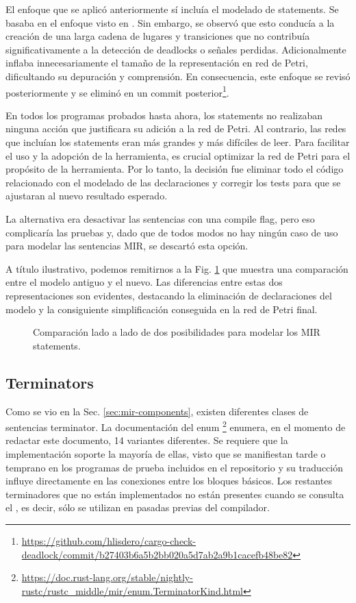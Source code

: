 El enfoque que se aplicó anteriormente sí incluía el modelado de statements. Se basaba en el
enfoque visto en \cite{meyer2020}. Sin embargo, se observó que esto conducía a la creación de
una larga cadena de lugares y transiciones que no contribuía significativamente a la detección
de deadlocks o señales perdidas. Adicionalmente inflaba innecesariamente el tamaño de la
representación en red de Petri, dificultando su depuración y comprensión. En consecuencia,
este enfoque se revisó posteriormente y se eliminó en un
commit posterior\footnote{\url{https://github.com/hlisdero/cargo-check-deadlock/commit/b27403b6a5b2bb020a5d7ab2a9b1cacefb48be82}}.

En todos los programas probados hasta ahora, los statements no realizaban
ninguna acción que justificara su adición a la red de Petri. Al contrario, las redes que
incluían los statements eran más grandes y más difíciles de leer. Para facilitar el uso y la
adopción de la herramienta, es crucial optimizar la red de Petri para el propósito de la
herramienta. Por lo tanto, la decisión fue eliminar todo el código relacionado con el modelado
de las declaraciones y corregir los tests para que se ajustaran al nuevo resultado esperado.

La alternativa era desactivar las sentencias con una compile flag, pero eso
complicaría las pruebas y, dado que de todos modos no hay ningún caso de uso para modelar
las sentencias \acrshort{MIR}, se descartó esta opción.

A título ilustrativo, podemos remitirnos a la Fig. \ref{fig:statement-model-comparison}
que muestra una comparación entre el modelo antiguo y el nuevo.
Las diferencias entre estas dos representaciones son
evidentes, destacando la eliminación de declaraciones del modelo y la consiguiente
simplificación conseguida en la red de Petri final.

\begin{figure}[!htb]
  \centering
  
  \caption{Comparación lado a lado de dos posibilidades para modelar los MIR statements.}
  \label{fig:statement-model-comparison}
\end{figure}

\subsection{Terminators}
\label{sec:terminators}

Como se vio en la Sec. \ref{sec:mir-components}, existen diferentes clases de sentencias terminator.
La documentación del enum \footnote{\url{https://doc.rust-lang.org/stable/nightly-rustc/rustc_middle/mir/enum.TerminatorKind.html}}
enumera, en el momento de redactar este documento, 14 variantes diferentes.
Se requiere que la implementación soporte la mayoría de
ellas, visto que se manifiestan tarde o temprano en los programas de prueba incluidos en el repositorio
y su traducción influye directamente en las conexiones entre los bloques básicos. Los restantes
terminadores que no están implementados no están presentes cuando se consulta el
, es decir, sólo se utilizan en pasadas previas del compilador.

